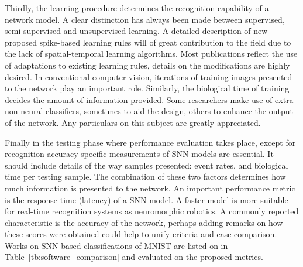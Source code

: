 Thirdly, the learning procedure determines the recognition capability of a network model.
A clear distinction has always been made between supervised, semi-supervised and unsupervised learning.
A detailed description of new proposed spike-based learning rules will of great contribution to the field due to the lack of spatial-temporal learning algorithms.
Most publications reflect the use of adaptations to existing learning rules, details on the modifications are highly desired.
In conventional computer vision, iterations of training images presented to the network play an important role.
Similarly, the biological time of training decides the amount of information provided.
Some researchers make use of extra non-neural classifiers, sometimes to aid the design, others to enhance the output of the network.
Any particulars on this subject are greatly appreciated.


Finally in the testing phase where performance evaluation takes place, except for recognition accuracy specific measurements of SNN models are essential.
It should include details of the way samples presented: event rates, and biological time per testing sample.
The combination of these two factors determines how much information is presented to the network.
An important performance metric is the response time (latency) of a SNN model.
A faster model is more suitable for real-time recognition systems as neuromorphic robotics.
A commonly reported characteristic is the accuracy of the network, perhaps adding remarks on how these scores were obtained could help to unify criteria and ease comparison.
Works on SNN-based classifications of MNIST are listed on in Table~\ref{tb:software_comparison} and evaluated on the proposed metrics.

